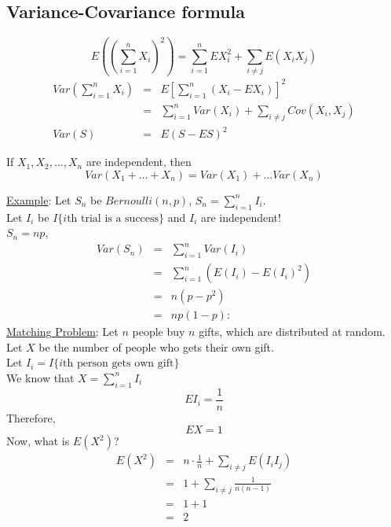   \subsection*{Variance-Covariance formula}
    $$
      E((\sum_{i = 1}^n X_i)^2) = \sum_{i = 1}^n EX_i^2 + \sum_{i \not= j}
      E(X_iX_j)
    $$
    \begin{eqnarray*}
      Var(\sum_{i = 1}^n X_i) & = & E[\sum_{i = 1}^n (X_i - EX_i)]^2\\
      & = & \sum_{i = 1}^n Var(X_i) + \sum_{i \not= j } Cov(X_i, X_j)\\
      Var(S) & = & E(S - ES)^2
    \end{eqnarray*}
    \begin{corollary}
      If $X_1, X_2, \ldots, X_n$ are independent, then
      $$
        Var(X_1 + \ldots + X_n) = Var(X_1) + \ldots Var(X_n)
      $$
    \end{corollary}
    \noindent\underline{Example}: Let $S_n$ be $Bernoulli(n, p)$, $S_n = 
    \sum_{i = 1}^n
    I_i$.\\
    Let $I_i$ be $I\{\text{$i$th trial is a success}\}$ and $I_i$ are 
    independent!\\
    $S_n = np$, 
    \begin{eqnarray*}
      Var(S_n) & = &  \sum_{i = 1}^n Var(I_i)\\
        & = & \sum_{i = 1}^n (E(I_i) - E(I_i)^2)\\
        & = & n(p - p^2)\\
        & = & np(1- p):
    \end{eqnarray*}
    \underline{Matching Problem}: Let $n$ people buy $n$ gifts, which are 
    distributed at random.\\
    Let $X$ be the number of people who gets their own gift.\\
    Let $I_i = I\{\text{$i$th person gets own gift} \}$\\
    We know that $X = \sum_{i = 1}^n I_i$\\
    $$
      EI_i = \frac{1}{n}
    $$
    Therefore,
    $$
      EX = 1
    $$
    Now, what is $E(X^2)$?\\
    \begin{eqnarray*}
      E(X^2) & = & n \cdot \frac{1}{n} + \sum_{i \not= j} E(I_iI_j)\\
      & = & 1 + \sum_{i \not= j} \frac{1}{n(n-1)}\\
      & = & 1 + 1\\
      & = & 2
    \end{eqnarray*}
